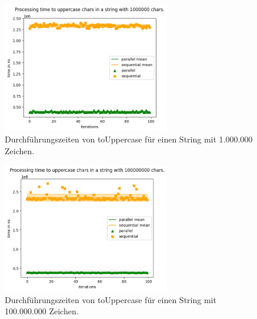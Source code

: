 \documentclass[plainarticle,zihtitle,german,final,hyperref,utf8]{zihpub}
\begin{document}
\begin{figure}[h]
\begin{center}
	\includegraphics[width=0.65\textwidth]{images/comp_upper_1000000.png}
	\caption{Durchführungszeiten von toUppercase für einen String mit 1.000.000 Zeichen.}
\end{center}
\end{figure}
\begin{figure}[h]
\begin{center}
	\includegraphics[width=0.65\textwidth]{images/comp_upper_100000000.png}
	\caption{Durchführungszeiten von toUppercase für einen String mit 100.000.000 Zeichen.}
\end{center}
\end{figure}

\clearpage
\end{document}
